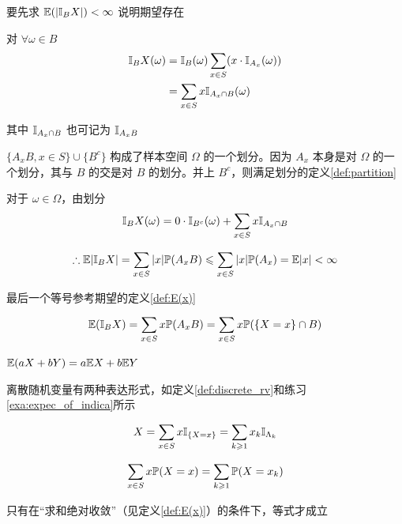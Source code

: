 \begin{solution*}
要先求 $\mathbb E(|\mathbb I_B X|)<\infty$ 说明期望存在

对 $\forall \omega\in B$
\[
\begin{aligned}
    \mathbb I_B X(\omega)&=\mathbb I_B(\omega)\sum_{x\in S}(x\cdot \mathbb I_{A_x}(\omega))\\
    &=\sum_{x\in S}x\mathbb I_{A_x\cap B}(\omega)
\end{aligned}
\]

其中 $\mathbb I_{A_x\cap B}$ 也可记为 $\mathbb I_{A_x B}$

$\{A_x B,x\in S\}\cup \{B^c\}$ 构成了样本空间 $\Omega$ 的一个划分。因为 $A_x$ 本身是对 $\Omega$ 的一个划分，其与 $B$ 的交是对 $B$ 的划分。并上 $B^c$，则满足划分的定义\ref{def:partition}

对于 $\omega\in \Omega$，由划分
\[
\mathbb I_B X(\omega)=0\cdot \mathbb I_{B^c}(\omega)+\sum_{x\in S}x\mathbb I_{A_x\cap B}
\]

\[
\therefore \mathbb E |\mathbb I_B X|=\sum_{x\in S}|x|\mathbb{P}(A_x B)\leqslant \sum_{x\in S}|x|\mathbb{P}(A_x)=\mathbb E|x|<\infty
\]

最后一个等号参考期望的定义\ref{def:E(x)}

\[
\mathbb E (\mathbb I_B X)=\sum_{x\in S}x \mathbb{P}(A_x B)=\sum_{x\in S}x \mathbb{P}(\{X=x\}\cap B)
\]
\end{solution*}

\begin{theorem}
    $\mathbb E(aX+bY)=a\mathbb E X+b\mathbb E Y$
\end{theorem}

离散随机变量有两种表达形式，如定义\ref{def:discrete_rv}和练习\ref{exa:expec_of_indica}所示

\[
X=\sum_{x\in S}x\mathbb I_{\{X=x\}}=\sum_{k\geqslant 1}x_k\mathbb I_{\Lambda_k}
\]

\[
\sum_{x\in S}x\mathbb{P}(X=x)=\sum_{k\geqslant 1}\mathbb{P}(X=x_k)
\]

只有在“求和绝对收敛”（见定义\ref{def:E(x)}）的条件下，等式才成立

